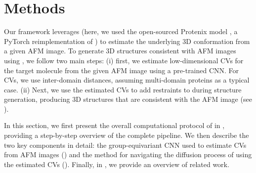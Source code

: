 \section{Methods}

Our \Model framework leverages \AFiii (here, we used the open-sourced Protenix model \cite{bytedance2025protenix}, a PyTorch reimplementation of \AFiii) to estimate the underlying 3D conformation from a given AFM image. 
To generate 3D structures consistent with AFM images using \AFiii, we follow two main steps: 
(i) first, we estimate low-dimensional CVs for the target molecule from the given AFM image using a pre-trained CNN. For CVs, we use inter-domain distances, assuming multi-domain proteins as a typical case. 
(ii) Next, we use the estimated CVs to add restraints to \AFiii during structure generation, producing 3D structures that are consistent with the AFM image (see ).

In this section, we first present the overall computational protocol of \Model in , providing a step-by-step overview of the complete pipeline.
We then describe the two key components in detail: the group-equivariant CNN used to estimate CVs from AFM images () and the method for navigating the diffusion process of \AFiii using the estimated CVs ().
Finally, in , we provide an overview of related work.






